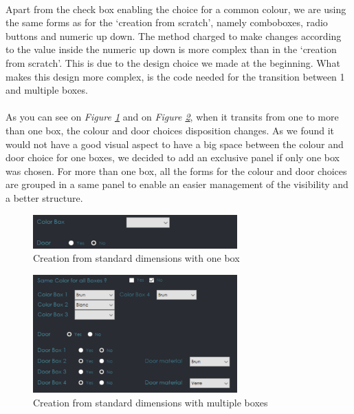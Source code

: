 \documentclass[12pt,oneside]{report}
\begin{document}
            \paragraph{}
            Apart from the check box enabling the choice for a common colour, we are using the same forms as for the ‘creation from scratch’, namely comboboxes, radio buttons and numeric up down. The method charged to make changes according to the value inside the numeric up down is more complex than in the ‘creation from scratch’. This is due to the design choice we made at the beginning. What makes this design more complex, is the code needed for the transition between 1 and multiple boxes.
            
            \paragraph{}
            As you can see on \textit{Figure \ref{fig:oneBox}} and on \textit{Figure \ref{fig:MultiBoxes}}, when it transits from one to more than one box, the colour and door choices disposition changes. As we found it would not have a good visual aspect to have a big space between the colour and door choice for one boxes, we decided to add an exclusive panel if only one box was chosen. For more than one box, all the forms for the colour and door choices are grouped in a same panel to enable an easier management of the visibility and a better structure.
            \newpage
            
             \begin{figure}[h!]
                \centering
    			\includegraphics[width = 0.7\textwidth]{Figures/boxOne.PNG}
    			\caption{Creation from standard dimensions with one box}
    			\label{fig:oneBox}
    		\end{figure}
    		\vspace{\baselineskip}
    		
    		 \begin{figure}[h!]
                \centering
    			\includegraphics[width = 0.7\textwidth]{Figures/boxMultiple.PNG}
    			\caption{Creation from standard dimensions with multiple boxes}
    			\label{fig:MultiBoxes}
    		\end{figure}
            
\end{document}

